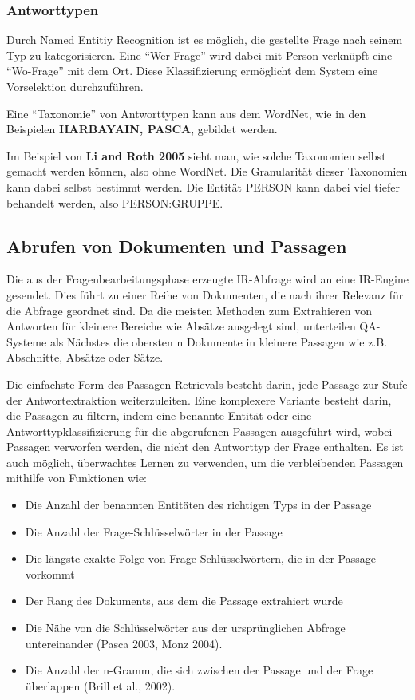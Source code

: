 \documentclass[
        ngerman,
        paper=a4,
        numbers=noendperiod,
]{scrreprt}
\begin{document}
\subsubsection{Antworttypen}

Durch Named Entitiy Recognition ist es möglich, die gestellte Frage nach seinem Typ zu kategorisieren. Eine \enquote{Wer-Frage} wird dabei mit Person verknüpft eine \enquote{Wo-Frage} mit dem Ort. Diese Klassifizierung ermöglicht dem System eine Vorselektion durchzuführen. 

Eine \enquote{Taxonomie} von Antworttypen kann aus dem WordNet, wie in den Beispielen \textbf{HARBAYAIN, PASCA}, gebildet werden.

Im Beispiel von \textbf{Li and Roth 2005} sieht man, wie solche Taxonomien selbst gemacht werden können, also ohne WordNet. Die Granularität dieser Taxonomien kann dabei selbst bestimmt werden. Die Entität PERSON kann dabei viel tiefer behandelt werden, also PERSON:GRUPPE. 


\subsection{Abrufen von Dokumenten und Passagen}
Die aus der Fragenbearbeitungsphase erzeugte IR-Abfrage wird an eine IR-Engine gesendet.
Dies führt zu einer Reihe von Dokumenten, die nach ihrer Relevanz für die Abfrage geordnet sind. Da die meisten Methoden zum Extrahieren von Antworten für kleinere Bereiche wie Absätze ausgelegt sind, unterteilen QA-Systeme als Nächstes die obersten n Dokumente in kleinere Passagen wie z.B. Abschnitte, Absätze oder Sätze. 


Die einfachste Form des Passagen Retrievals besteht darin, jede Passage zur Stufe der Antwortextraktion weiterzuleiten. Eine komplexere Variante besteht darin, die Passagen zu filtern, indem eine benannte Entität oder eine Antworttypklassifizierung für die abgerufenen Passagen ausgeführt wird, wobei Passagen verworfen werden, die nicht den Antworttyp der Frage enthalten. Es ist auch möglich, überwachtes Lernen zu verwenden, um die verbleibenden Passagen mithilfe von Funktionen wie:

\begin{itemize}
\item Die Anzahl der benannten Entitäten des richtigen Typs in der Passage
\item Die Anzahl der Frage-Schlüsselwörter in der Passage 
\item Die längste exakte Folge von Frage-Schlüsselwörtern, die in der Passage vorkommt
\item Der Rang des Dokuments, aus dem die Passage extrahiert wurde
\item Die Nähe von die Schlüsselwörter aus der ursprünglichen Abfrage untereinander (Pasca 2003, Monz 2004).
\item Die Anzahl der n-Gramm, die sich zwischen der Passage und der Frage überlappen (Brill et al., 2002).
\end{itemize}
\end{document}
